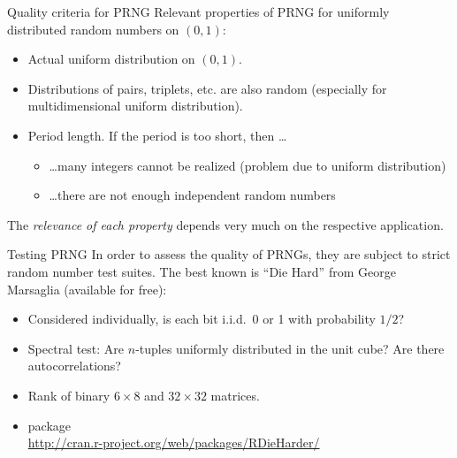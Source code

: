 \begin{vbframe}{Quality criteria for PRNG}
Relevant properties of PRNG for uniformly distributed random numbers on $(0, 1)$:
\begin{itemize}
\item Actual uniform distribution on $(0, 1)$.
\item Distributions of pairs, triplets, etc. are also random (especially for multidimensional
  uniform distribution).
\item Period length. If the period is too short, then \ldots
\begin{itemize}
\item \ldots many integers cannot be realized (problem due to uniform distribution)
\item \ldots there are not enough independent random numbers
\end{itemize}
\end{itemize}
The \emph{relevance of each property} depends very much on the respective
application.
\end{vbframe}

\begin{vbframe}{Testing PRNG}
In order to assess the quality of PRNGs, they are subject to strict random number test suites.
The best known is \enquote{Die Hard} from George
Marsaglia (available for free):
\begin{itemize}
 \item Considered individually, is each bit i.i.d.\ 0 or 1 with probability $1/2$?
 \item Spectral test: Are $n$-tuples uniformly distributed in the unit cube?
  Are there autocorrelations?
 \item Rank of binary $6\times 8$ and $32\times 32$ matrices.
 \item {} package  \\
    \url{http://cran.r-project.org/web/packages/RDieHarder/}
\end{itemize}
\end{vbframe}


\endlecture

